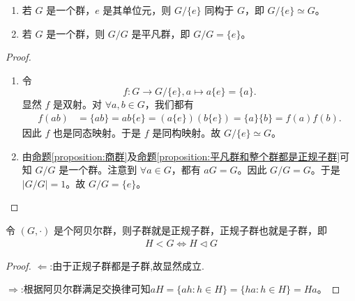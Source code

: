 \documentclass[../../main.tex]{subfiles}
\begin{document}
\begin{corollary}\label{corollary:G/{e}同构于G,G/G={e}}
\begin{enumerate}[(1)]
\item 若 $G$ 是一个群，$e$ 是其单位元，则 $G/\{e\}$ 同构于 $G$，即 $G/\{e\}\simeq G$。

\item 若 $G$ 是一个群，则 $G/G$ 是平凡群，即 $G/G = \{e\}$。
\end{enumerate}
\end{corollary}
\begin{proof}
\begin{enumerate}[(1)]
\item 令 
\[f:G\rightarrow G/\{e\}, a\mapsto a\{e\}=\{a\}.\]
显然 $f$ 是双射。对 $\forall a,b\in G$，我们都有
\begin{align*}
f(ab)&=\{ab\}=ab\{e\}=(a\{e\})(b\{e\})=\{a\}\{b\}=f(a)f(b).
\end{align*}
因此 $f$ 也是同态映射。于是 $f$ 是同构映射。故 $G/\{e\}\simeq G$。

\item 由\hyperref[proposition:商群]{命题\ref{proposition:商群}}及\hyperref[proposition:平凡群都是正规子群]{命题\ref{proposition:平凡群和整个群都是正规子群}}可知 $G/G$ 是一个群。注意到 $\forall a\in G$，都有 $aG = G$。因此 $G/G = G$。于是 $|G/G| = 1$。故 $G/G = \{e\}$。 
\end{enumerate}
\end{proof}

\begin{proposition}\label{proposition:阿贝尔群的子群与正规子群等价}
令 $(G,\cdot)$ 是个阿贝尔群，则子群就是正规子群，正规子群也就是子群，即
\begin{align*}
H < G\iff H\lhd G
\end{align*}
\end{proposition}
\begin{proof}
$\Leftarrow$:由于正规子群都是子群,故显然成立.

$\Rightarrow$:根据阿贝尔群满足交换律可知$aH = \{ah:h\in H\} = \{ha:h\in H\} = Ha$。
\end{proof}
\end{document}
